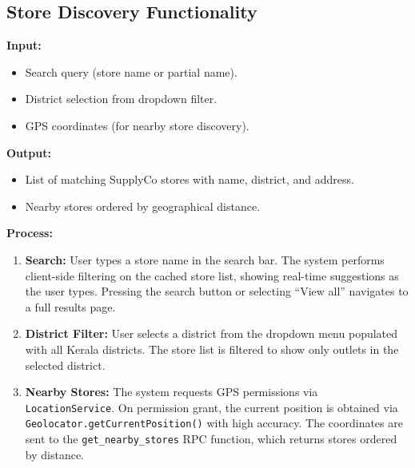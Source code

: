 \subsection{Store Discovery Functionality}

\textbf{Input:}
\begin{itemize}
    \item Search query (store name or partial name).
    \item District selection from dropdown filter.
    \item GPS coordinates (for nearby store discovery).
\end{itemize}

\textbf{Output:}
\begin{itemize}
    \item List of matching SupplyCo stores with name, district, and address.
    \item Nearby stores ordered by geographical distance.
\end{itemize}

\textbf{Process:}
\begin{enumerate}
    \item \textbf{Search:} User types a store name in the search bar. The system performs client-side filtering on the cached store list, showing real-time suggestions as the user types. Pressing the search button or selecting ``View all'' navigates to a full results page.

    \item \textbf{District Filter:} User selects a district from the dropdown menu populated with all Kerala districts. The store list is filtered to show only outlets in the selected district.

    \item \textbf{Nearby Stores:} The system requests GPS permissions via \texttt{LocationService}. On permission grant, the current position is obtained via \newline \texttt{Geolocator.getCurrentPosition()} with high accuracy. The coordinates are sent to the \texttt{get\_nearby\_stores} RPC function, which returns stores ordered by distance.
\end{enumerate}

